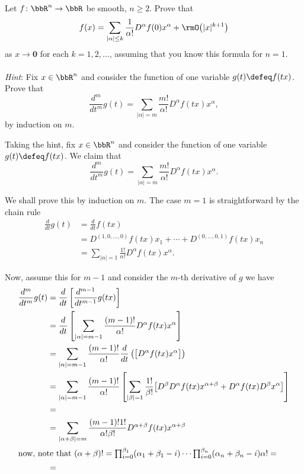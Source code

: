 \begin{problem}
  Let \(f\colon\bbR^n\to\bbR\) be smooth, \(n\geq 2\). Prove that
  \[
    f(x)=\sum_{|\alpha|\leq k}
    \frac{1}{\alpha!}D^\alpha f(0)x^\alpha+\rmO\bigl(|x|^{k+1}\bigr)
  \]
  as \(x\to\mathbf{0}\) for each \(k=1,2,\dotsc\), assuming that you know this
  formula for \(n=1\).
  \\\\
  \emph{Hint}: Fix \(x\in\bbR^n\) and consider the function of one variable
  \(g(t)\defeq f(tx)\). Prove that
  \[
    \frac{d^m}{d t^m}g(t)
    =\sum_{|\alpha|=m}\frac{m!}{\alpha!} D^\alpha f(tx)x^\alpha,
  \]
  by induction on \(m\).
\end{problem}
\begin{solution}
  Taking the hint, fix \(x\in\bbR^n\) and consider the function of one
  variable \(g(t)\defeq f(tx)\). We claim that
  \[
    \frac{d^m}{d t^m}g(t)%
    =\sum_{|\alpha|=m}\frac{m!}{\alpha!}D^\alpha f(tx)x^\alpha.%
  \]
  \begin{subproof}
    We shall prove this by induction on \(m\). The case \(m=1\) is
    straightforward by the chain rule
    \begin{align*}
      \frac{d}{dt}g(t)
      &=\frac{d}{dt}f(tx)\\
      &=D^{(1,0,\dotsc,0)}f(tx)x_1+\dotsb+D^{(0,\dotsc,0,1)}f(tx)x_n\\
      &=\sum_{|\alpha|=1}\frac{1!}{\alpha!}D^\alpha f(tx)x^\alpha.
    \end{align*}

    Now, assume this for \(m-1\) and consider the \(m\)-th derivative of
    \(g\) we have
    \begin{align*}
      \frac{d^m}{dt^m}g(t)%
      &=\frac{d}{dt}\left[\frac{d^{m-1}}{dt^{m-1}}g(tx)\right]\\
      &=\frac{d}{dt}%
        \left[%
        \sum_{|\alpha|=m-1}\frac{(m-1)!}{\alpha!}D^\alpha f(tx)x^\alpha%
        \right]\\
      &=\sum_{|\alpha|=m-1}\frac{(m-1)!}{\alpha!}%
        \frac{d}{dt}%
        \left(
        \bigl[%
        D^\alpha f(tx)x^\alpha%
        \bigr]
        \right)\\
      &=\sum_{|\alpha|=m-1}\frac{(m-1)!}{\alpha!}%
        \left[%
        \sum_{|\beta|=1}\frac{1!}{\beta!}
       \bigl[
        D^\beta D^\alpha f(tx)x^{\alpha+\beta}+D^\alpha f(tx)D^\beta x^\alpha
        \bigr]
        \right]\\
      &=\\
      &=\sum_{|\alpha+\beta|=m}
        \frac{(m-1)!1!}{\alpha!\beta!}D^{\alpha+\beta}f(tx)x^{\alpha+\beta}\\
      \intertext{now, note that
      \((\alpha+\beta)!=\prod_{i=0}^{\beta_1}(\alpha_1+\beta_1-i)\dotsm\prod_{i=0}^{\beta_n}(\alpha_n+\beta_n-i)\alpha!=\)}
      &=
    \end{align*}
  \end{subproof}
\end{solution}
\newpage

